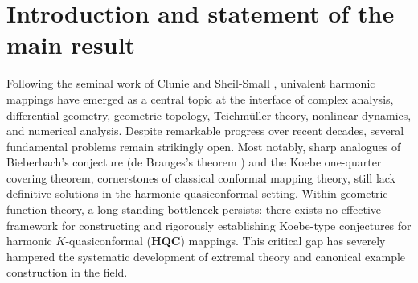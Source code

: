 \documentclass[11pt, reqno]{amsart}
\numberwithin{equation}{section}
\begin{document}




\begin{abstract} 

We first construct the harmonic $K$-quasiconformal Koebe functions, filling a long-standing foundational gap in geometric function theory. This construction provides a unified parametric candidate extremal function framework for conformal mappings, quasiconformal mappings, and harmonic mappings, and we formulate related conjectures for the extremal theory of harmonic $K$-quasiconformal mappings. By combining this construction with Astala and Koskela's $H^p$-theory for quasiconformal mappings, we establish a sharp result concerning the optimal order of harmonic $K$-quasiconformal mappings with bounded Schwarzian norm in harmonic Hardy spaces. Motivated by the work of Chuaqui, Hernández, and Mart\'in’s [Math. Ann. 367, 1099–1122 (2017)], this result gives a partial solution to Pavlovi\'c's  2014 open problem on the embeddings of harmonic quasiconformal mappings into Hardy spaces, and outlines a path toward its complete solution.
\end{abstract} \maketitle




\section{Introduction and statement of the main result}\label{s1} 

Following the seminal work of Clunie and Sheil-Small \cite{cs}, univalent harmonic mappings have emerged as a central topic at the interface of complex analysis, differential geometry, geometric topology, Teichm\"{u}ller theory, nonlinear dynamics, and numerical analysis. Despite remarkable progress over recent decades, several fundamental problems remain strikingly open. Most notably, sharp analogues of Bieberbach's conjecture (de Branges's theorem \cite{de}) and the Koebe one-quarter covering theorem, cornerstones of classical conformal mapping theory, still lack definitive solutions in the harmonic quasiconformal setting. Within geometric function theory, a long-standing bottleneck persists: there exists no effective framework for constructing and rigorously establishing Koebe-type conjectures for harmonic $K$-quasiconformal (\textbf{HQC}) mappings. This critical gap has severely hampered the systematic development of extremal theory and canonical example construction in the field. 
\end{document}
